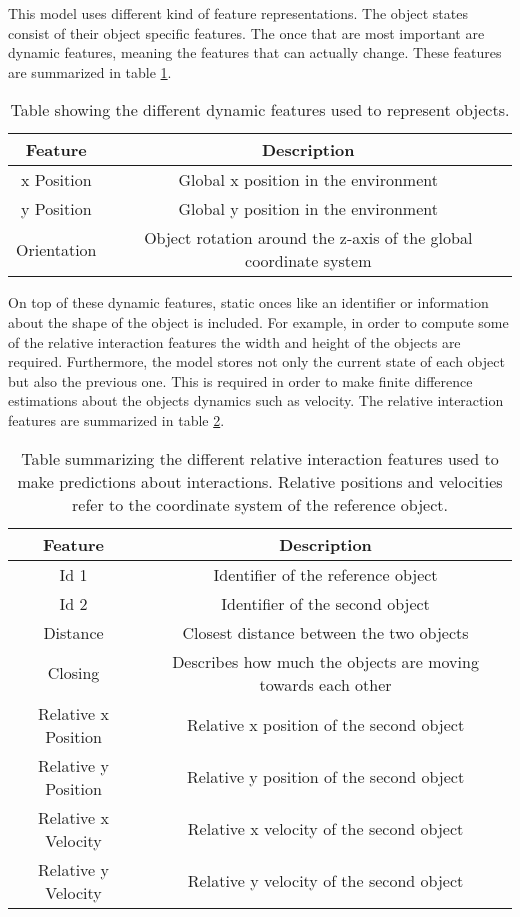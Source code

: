 This model uses different kind of feature representations. The object states consist of their object specific features. The once that are most important are dynamic features, meaning the features that can actually change. These features are summarized in table \ref{tab:gateObjectFeatures}.

\begin{table}
	\centering
	\begin{tabular}{|c|c|}
		\hline Feature & Description \\ 
		\hline x Position & Global x position in the environment \\ 
		\hline y Position & Global y position in the environment \\ 
		\hline Orientation & Object rotation around the z-axis of the global coordinate system \\ 
		\hline 
	\end{tabular} 
	\caption{Table showing the different dynamic features used to represent objects.}
	\label{tab:gateObjectFeatures}
\end{table}

On top of these dynamic features, static onces like an identifier or information about the shape of the object is included. For example, in order to compute some of the relative interaction features the width and height of the objects are required. Furthermore, the model stores not only the current state of each object but also the previous one. This is required in order to make finite difference estimations about the objects dynamics such as velocity. 
The relative interaction features are summarized in table \ref{tab:gateInteractionFeatures}. 

\begin{table}
	\centering
	\begin{tabular}{|c|c|}
		\hline Feature & Description \\ 
		\hline Id 1 & Identifier of the reference object \\ 
		\hline Id 2 & Identifier of the second object \\ 
		\hline Distance & Closest distance between the two objects \\
		\hline Closing & Describes how much the objects are moving towards each other \\
		\hline Relative x Position & Relative x position of the second object \\
		\hline Relative y Position & Relative y position of the second object \\
		\hline Relative x Velocity & Relative x velocity of the second object \\
		\hline Relative y Velocity & Relative y velocity of the second object \\
		\hline 
	\end{tabular} 
	\caption{Table summarizing the different relative interaction features used to make predictions about interactions. Relative positions and velocities refer to the coordinate system of the reference object.}
	\label{tab:gateInteractionFeatures}
\end{table}

